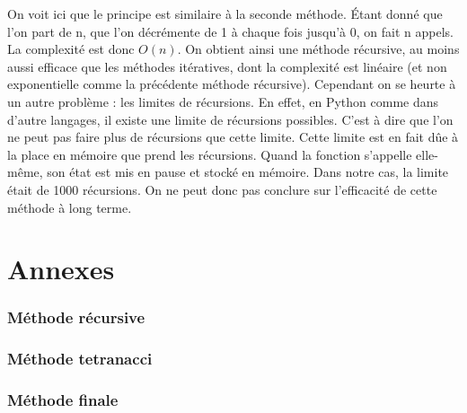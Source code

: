 \documentclass{article}
\newcommand{\code}[1]{}
\begin{document}
On voit ici que le principe est similaire à la seconde méthode. \'Etant donné que l'on part de n, que l'on décrémente de 1 à chaque fois jusqu'à 0, on fait n appels. La complexité est donc $O(n)$. On obtient ainsi une méthode récursive, au moins aussi efficace que les méthodes itératives, dont la complexité est linéaire (et non exponentielle comme la précédente méthode récursive). Cependant on se heurte à un autre problème : les limites de récursions. En effet, en Python comme dans d'autre langages, il existe une limite de récursions possibles. C'est à dire que l'on ne peut pas faire plus de récursions que cette limite. Cette limite est en fait dûe à la place en mémoire que prend les récursions. Quand la fonction s'appelle elle-même, son état est mis en pause et stocké en mémoire. Dans notre cas, la limite était de 1000 récursions. On ne peut donc pas conclure sur l'efficacité de cette méthode à long terme.

\newpage
\part{Annexes}
\section*{Méthode récursive}
\code{Algos/Problem117_1_rapport.py}


\section*{Méthode tetranacci}
\code{Algos/Problem117_2_rapport.py}

\newpage
\section*{Méthode finale}
\code{Algos/Problem117_3_rapport.py}
\end{document}
